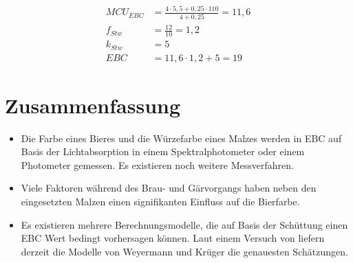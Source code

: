 \documentclass[a4paper,parskip=half]{scrartcl}
\newcommand{\MCUEBC}{\mathit{MCU}_{EBC}}
\newcommand{\EBC}{\mathit{EBC}}
\newcommand{\fstw}{f_{Stw}}
\newcommand{\kstw}{k_{Stw}}
\begin{document}
\begin{align*}
\MCUEBC &= \frac{4 \cdot 5,5 + 0,25 \cdot 110}{4 + 0,25} = 11,6 \\
\fstw &= \frac{12}{10} = 1,2 \\
\kstw &= 5 \\
\EBC &= 11,6 \cdot 1,2 + 5 = 19
\end{align*}

\section*{Zusammenfassung}

\begin{itemize}
\item Die Farbe eines Bieres und die Würzefarbe eines Malzes werden in EBC auf Basis der Lichtabsorption in einem Spektralphotometer oder einem Photometer gemessen. Es existieren noch weitere Messverfahren.
\item Viele Faktoren während des Brau- und Gärvorgangs haben neben den eingesetzten Malzen einen signifikanten Einfluss auf die Bierfarbe.
\item Es existieren mehrere Berechnungsmodelle, die auf Basis der Schüttung einen EBC Wert bedingt vorhersagen können. Laut einem Versuch von \citeauthor{KrausWeyermann2022} liefern derzeit die Modelle von Weyermann und Krüger die genauesten Schätzungen.
\end{itemize}

\printbibliography[title=Quellen]
\end{document}
